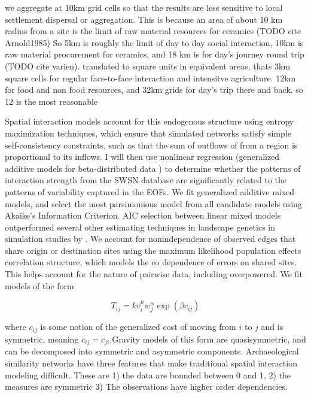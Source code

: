 \documentclass[fleqn,10pt]{wlscirep}
\begin{document}
 we aggregate at 10km grid cells so that the results are less sensitive to local settlement dispersal or aggregation.
 This is because an area of about 10 km radius from a site is the limit of raw material resources for ceramics (TODO cite Arnold1985)
 So 5km is roughly the limit of day to day social interaction, 10km is raw material procurement for ceramics, and 18 km is for day's journey round trip (TODO cite varien). translated to square units in equivalent areas, thats 3km square cells for regular face-to-face interaction and intensitve agriculture. 12km for food and non food resources, and 32km grids for day's trip there and back. so 12 is the most reasonable
 
Spatial interaction models account for this endogenous structure using entropy maximization techniques, which ensure that simulated networks satisfy simple self-consistency constraints, such as that the sum of outflows of from a region is proportional to its inflows.
I will then use nonlinear regression (generalized additive models for beta-distributed data \cite{Wood2006a}) to determine whether the patterns of interaction strength from the SWSN database are significantly related to the patterns of variability captured in the EOFs.
We fit generalized additive mixed models, and select the most parsimonious model from all candidate models using Akaike's Information Criterion. AIC selection between linear mixed models outperformed several other estimating techniques in landscape genetics in simulation studies by \cite{Shirk et al 2018}. We account for nonindependence of observed edges that share origin or destination sites using the maximum likelihood population effects correlation structure, which models the co dependence of errors on shared sites. This helps account for the nature of pairwise data, including overpowered.
We fit models of the form

\begin{equation}
T_{ij} = k v_i^\mu w_j^\alpha \exp(\beta c_{ij})
\end{equation}

where $c_{ij}$ is some notion of the generalized cost of moving from $i$ to $j$ and is symmetric, meaning $c_{ij} = c_{ji}$.Gravity models of this form are quasisymmetric, and can be decomposed into symmetric and asymmetric components. 
Archaeological similarity networks have three features that make traditional spatial interaction modeling difficult. These are 1) the data are bounded between 0 and 1, 2) the measures are symmetric
3) The observations have higher order dependencies.
\end{document}
